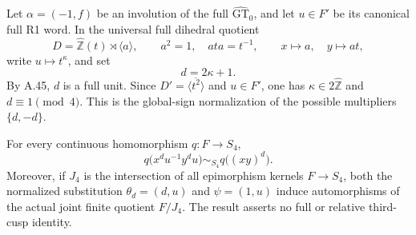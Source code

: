 Let \(\alpha=(-1,f)\) be an involution of the full
\(\widehat{\mathrm{GT}}_0\), and let \(u\in F'\) be its
canonical full R1 word. In the universal full dihedral quotient
\[
 D=\widehat{\mathbb Z}(t)\rtimes\langle a\rangle,\qquad
 a^2=1,\quad ata=t^{-1},\qquad x\longmapsto a,\quad y\longmapsto at,
\]
write \(u\longmapsto t^\kappa\), and set
\[
                         d=2\kappa+1.
 \tag{C.40.1}
\]
By A.45, \(d\) is a full unit. Since \(D'=\overline{\langle
t^2\rangle}\) and \(u\in F'\), one has \(\kappa\in2\widehat{\mathbb Z}\)
and \(d\equiv1\pmod4\). This is the global-sign normalization
of the possible multipliers \(\{d,-d\}\).

For every continuous homomorphism \(q:F\to S_4\),
\[
 q\bigl(x^d u^{-1}y^d u\bigr)\sim_{S_4}q\bigl((xy)^d\bigr).
 \tag{C.40.2}
\]
Moreover, if \(J_4\) is the intersection of all epimorphism
kernels \(F\to S_4\), both the normalized substitution
\(\theta_d=(d,u)\) and \(\psi=(1,u)\) induce automorphisms
of the actual joint finite quotient \(F/J_4\).
The result asserts no full or relative third-cusp identity.

